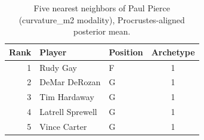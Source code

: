 \begin{table}[htbp]
  \centering\small
  \begin{tabular}{rllc}
    \toprule
    Rank & Player & Position & Archetype \\
    \midrule
    1 & Rudy Gay & F & 1 \\
    2 & DeMar DeRozan & G & 1 \\
    3 & Tim Hardaway & G & 1 \\
    4 & Latrell Sprewell & G & 1 \\
    5 & Vince Carter & G & 1 \\
    \bottomrule
  \end{tabular}
  \caption{Five nearest neighbors of Paul Pierce (curvature_m2 modality), Procrustes-aligned posterior mean.}
  \label{tab:Paul_Pierce_neighbors_curvature_m2}
\end{table}

